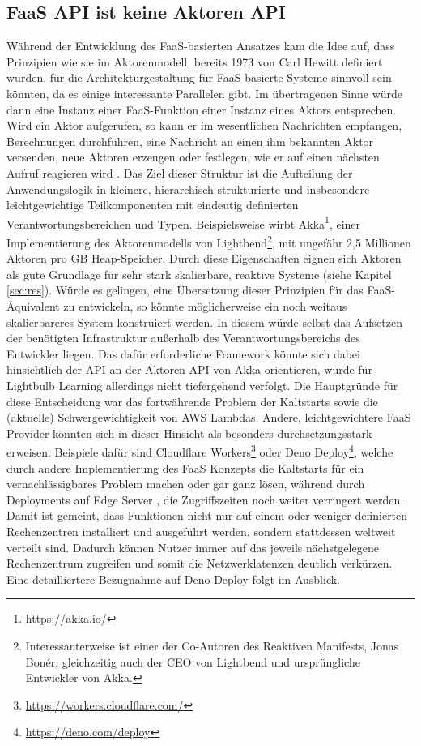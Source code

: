 \subsection{FaaS API ist keine Aktoren API}
Während der Entwicklung des FaaS-basierten Ansatzes kam die Idee auf, dass Prinzipien wie sie im Aktorenmodell, bereits 1973 von Carl Hewitt \cite[vgl.][]{Hewitt1973} definiert wurden, für die Architekturgestaltung für FaaS basierte Systeme sinnvoll sein könnten, da es einige interessante Parallelen gibt. Im übertragenen Sinne würde dann eine Instanz einer FaaS-Funktion einer Instanz eines Aktors entsprechen. Wird ein Aktor aufgerufen, so kann er im wesentlichen Nachrichten empfangen, Berechnungen durchführen, eine Nachricht an einen ihm bekannten Aktor versenden, neue Aktoren erzeugen oder festlegen, wie er auf einen nächsten Aufruf reagieren wird \cite[vgl.][]{Hewitt2010}. Das Ziel dieser Struktur ist die Aufteilung der Anwendungslogik in kleinere, hierarchisch strukturierte und insbesondere leichtgewichtige Teilkomponenten mit eindeutig definierten Verantwortungsbereichen und Typen. Beispielsweise wirbt Akka\footnote{\url{https://akka.io/}}, einer Implementierung des Aktorenmodells von Lightbend\footnote{Interessanterweise ist einer der Co-Autoren des Reaktiven Manifests, Jonas Bonér, gleichzeitig auch der CEO von Lightbend und ursprüngliche Entwickler von Akka.}, mit ungefähr 2,5 Millionen Aktoren pro GB Heap-Speicher. Durch diese Eigenschaften eignen sich Aktoren als gute Grundlage für sehr stark skalierbare, reaktive Systeme (siehe Kapitel \ref{sec:res}). Würde es gelingen, eine Übersetzung dieser Prinzipien für das FaaS-Äquivalent zu entwickeln, so könnte möglicherweise ein noch weitaus skalierbareres System konstruiert werden. In diesem würde selbst das Aufsetzen der benötigten Infrastruktur außerhalb des Verantwortungsbereichs des Entwickler liegen. Das dafür erforderliche Framework könnte sich dabei hinsichtlich der API an der Aktoren API von Akka orientieren, wurde für Lightbulb Learning allerdings nicht tiefergehend verfolgt. Die Hauptgründe für diese Entscheidung war das fortwährende Problem der Kaltstarts sowie die (aktuelle) Schwergewichtigkeit von AWS Lambdas. Andere, leichtgewichtere FaaS Provider könnten sich in dieser Hinsicht als besonders durchsetzungsstark erweisen. Beispiele dafür sind Cloudflare Workers\footnote{\url{https://workers.cloudflare.com/}} oder Deno Deploy\footnote{\url{https://deno.com/deploy}}, welche durch andere Implementierung des FaaS Konzepts die Kaltstarts für ein vernachlässigbares Problem machen oder gar ganz lösen, während durch Deployments auf Edge Server \cite[vgl.][]{Meulen2018}, die Zugriffszeiten noch weiter verringert werden. Damit ist gemeint, dass Funktionen nicht nur auf einem oder weniger definierten Rechenzentren installiert und ausgeführt werden, sondern stattdessen weltweit verteilt sind. Dadurch können Nutzer immer auf das jeweils nächstgelegene Rechenzentrum zugreifen und somit die Netzwerklatenzen deutlich verkürzen. Eine detailliertere Bezugnahme auf Deno Deploy folgt im Ausblick.

